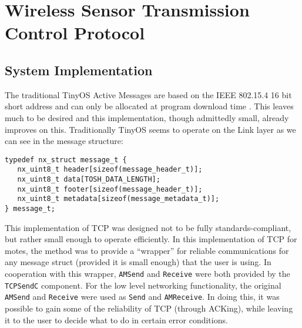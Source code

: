 \documentclass{sig-alternate}
\begin{document}
\section{Wireless Sensor Transmission Control Protocol}\label{actualstuff}

\subsection{System Implementation}\label{impl}
The traditional TinyOS Active Messages are based on the IEEE 802.15.4 16 bit short address and can only be allocated at program download time \cite{david}. This leaves much to be desired and this implementation, though admittedly small, already improves on this. Traditionally TinyOS seems to operate on the Link layer as we can see in the message structure:
\lstset{basicstyle=\footnotesize,numbers=left,numberstyle=\footnotesize,stepnumber=1,numbersep=5pt,showspaces=false,showstringspaces=false,showtabs=false,tabsize=2,captionpos=b,breaklines=true,breakatwhitespace=false,title=\lstname,}

\lstset{language=nesc,caption=tos/types/message.h,label=message_t,}
\begin{lstlisting}
typedef nx_struct message_t {
   nx_uint8_t header[sizeof(message_header_t)];
   nx_uint8_t data[TOSH_DATA_LENGTH];
   nx_uint8_t footer[sizeof(message_header_t)];
   nx_uint8_t metadata[sizeof(message_metadata_t)];
} message_t;
\end{lstlisting}


This implementation of TCP was designed not to be fully standards-compliant, but rather small enough to operate efficiently.  In this implementation of TCP for motes, the method was to provide a ``wrapper'' for reliable communications for any message struct (provided it is small enough) that the user is using.  In cooperation with this wrapper, \texttt{AMSend} and \texttt{Receive} were both provided by the \texttt{TCPSendC} component. For the low level networking functionality, the original \texttt{AMSend} and \texttt{Receive} were used as \texttt{Send} and \texttt{AMReceive}. In doing this, it was possible to gain some of the reliability of TCP (through ACKing), while leaving it to the user to decide what to do in certain error conditions.
\end{document}

